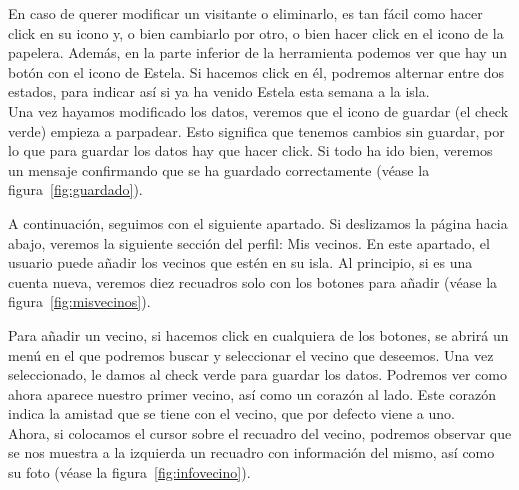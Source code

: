 
En caso de querer modificar un visitante o eliminarlo, es tan fácil como hacer click en su icono y, o bien cambiarlo por otro, o bien hacer click en el icono de la papelera. Además, en la parte inferior de la herramienta podemos ver que hay un botón con el icono de Estela. Si hacemos click en él, podremos alternar entre dos estados, para indicar así si ya ha venido Estela esta semana a la isla.\\

Una vez hayamos modificado los datos, veremos que el icono de guardar (el check verde) empieza a parpadear. Esto significa que tenemos cambios sin guardar, por lo que para guardar los datos hay que hacer click. Si todo ha ido bien, veremos un mensaje confirmando que se ha guardado correctamente {(v\'ease la figura~\ref{fig:guardado})}.\\


\clearpage

A continuación, seguimos con el siguiente apartado. Si deslizamos la página hacia abajo, veremos la siguiente sección del perfil: Mis vecinos. En este apartado, el usuario puede añadir los vecinos que estén en su isla. Al principio, si es una cuenta nueva, veremos diez recuadros solo con los botones para añadir {(v\'ease la figura~\ref{fig:misvecinos})}.\\


Para añadir un vecino, si hacemos click en cualquiera de los botones, se abrirá un menú en el que podremos buscar y seleccionar el vecino que deseemos. Una vez seleccionado, le damos al check verde para guardar los datos. Podremos ver como ahora aparece nuestro primer vecino, así como un corazón al lado. Este corazón indica la amistad que se tiene con el vecino, que por defecto viene a uno.\\

Ahora, si colocamos el cursor sobre el recuadro del vecino, podremos observar que se nos muestra a la izquierda un recuadro con información del mismo, así como su foto {(v\'ease la figura~\ref{fig:infovecino})}.\\


